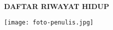 \clearpage
{}
{}
\begin{center}
    \textbf{\large DAFTAR RIWAYAT HIDUP}\\
\end{center}

\begin{flushright}
    \texttt{[image: foto-penulis.jpg]}
\end{flushright}


\datapribadi
